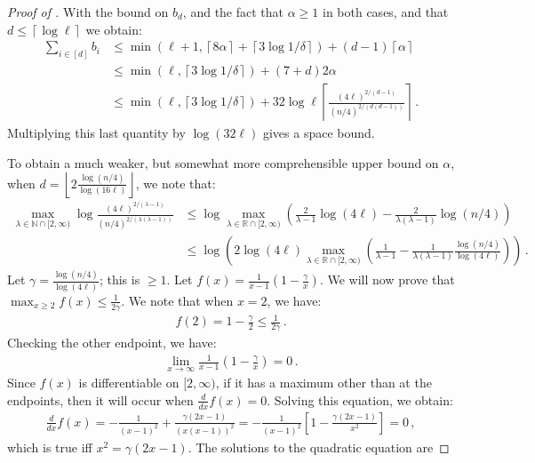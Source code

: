 \documentclass[10pt,a4paper]{article}
\theoremstyle{definition}
\theoremstyle{remark}
\newcommand{\NN}{\mathbb{N}}
\newcommand{\RR}{\mathbb{R}}
\newcommand{\ceil}[1]{{\left\lceil{#1}\right\rceil}}
\newcommand{\floor}[1]{{\left\lfloor{#1}\right\rfloor}}
\newcommand{\rl}{\mathbf{\ell}}             %
\begin{document}
\begin{itemize}
\begin{itemize}
\begin{proof}[Proof of ]
  With the bound on $b_d$, and the fact that $\alpha \ge 1$ in both cases, and that $d \le \ceil{\log \rl}$ we obtain:
  \begin{align*}
    \sum_{i \in [d]} b_i &\le \min(\rl + 1, \ceil{8 \alpha} + \ceil{3 \log 1/\delta}) + (d - 1) \ceil{\alpha} \\
      &\le \min(\rl, \ceil{3 \log 1/\delta}) + (7 + d) 2 \alpha \\
      &\le \min(\rl, \ceil{3 \log 1/\delta}) + 32 \log \rl \ceil{\frac{(4 \rl)^{2/(d-1)}}{(n/4)^{2/(d(d-1))}}} \,.
  \end{align*}
  Multiplying this last quantity by $\log(32 \rl)$ gives a space bound.

  To obtain a much weaker, but somewhat more comprehensible upper bound on $\alpha$, when $d = \floor{2 \frac{\log(n/4)}{\log(16\rl)}}$, we note that:
  \begin{align*}
    \max_{\lambda \in \NN \cap [2,\infty)} \log \frac{(4 \rl)^{2/(\lambda-1)}}{(n/4)^{2/(\lambda(\lambda-1))}} &\le \log \max_{\lambda \in \RR \cap [2,\infty)} \left(\frac{2}{\lambda - 1} \log(4\rl) - \frac{2}{\lambda(\lambda-1)} \log(n/4) \right) \\
    &\le \log \left(2 \log(4\rl) \max_{\lambda \in \RR \cap [2,\infty)} \left(\frac{1}{\lambda - 1} - \frac{1}{\lambda (\lambda -1)} \frac{\log(n/4)}{\log(4\rl)} \right)\right) \,.
  \end{align*}
  Let $\gamma = \frac{\log(n/4)}{\log(4\rl)}$; this is $\ge 1$. Let $f(x) = \frac{1}{x - 1} (1 - \frac{\gamma}{x})$. We will now prove that $\max_{x \ge 2} f(x) \le \frac{1}{2\gamma}$. We note that when $x = 2$, we have:
  \begin{align*}
    f(2) = 1 - \frac{\gamma}{2} \le \frac{1}{2\gamma} \,.
  \end{align*}
  Checking the other endpoint, we have:
  \begin{align*}
    \lim_{x \rightarrow \infty} \frac{1}{x - 1} (1 - \frac{\gamma}{x}) = 0 \,.
  \end{align*}
  Since $f(x)$ is differentiable on $[2,\infty)$, if it has a maximum other than at the endpoints, then it will occur when $\frac{d}{dx} f(x) = 0$. Solving this equation, we obtain:
  \begin{align*}
    \frac{d}{dx} f(x) = -\frac{1}{\left(x-1\right)^{2}}+\frac{\gamma\left(2x-1\right)}{\left(x\left(x-1\right)\right)^{2}} = -\frac{1}{\left(x-1\right)^{2}}\left[1-\frac{\gamma\left(2x-1\right)}{x^{2}}\right] = 0 \,,
  \end{align*}
  which is true iff $x^2 = \gamma(2x - 1)$. The solutions to the quadratic equation are

\end{proof}
\end{itemize}
\end{itemize}
\end{document}
